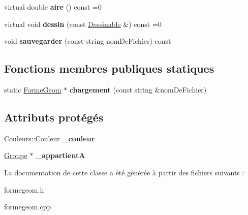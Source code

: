 \begin{DoxyCompactItemize}
\item 
\hypertarget{class_forme_geom_a1812fc8597994c1bc75a577785c356dd}{virtual double {\bfseries aire} () const =0}\label{class_forme_geom_a1812fc8597994c1bc75a577785c356dd}

\item 
\hypertarget{class_forme_geom_a80fabca42026f9a5d72fd12988da164e}{virtual void {\bfseries dessin} (const \hyperlink{class_dessinable}{Dessinable} \&) const =0}\label{class_forme_geom_a80fabca42026f9a5d72fd12988da164e}

\item 
\hypertarget{class_forme_geom_a25ff69dc148f04e4d9bc5e5305a08d10}{void {\bfseries sauvegarder} (const string nom\+De\+Fichier) const }\label{class_forme_geom_a25ff69dc148f04e4d9bc5e5305a08d10}

\end{DoxyCompactItemize}
\subsection*{Fonctions membres publiques statiques}
\begin{DoxyCompactItemize}
\item 
\hypertarget{class_forme_geom_a874df9fef2c3f6dd1b4eaf1496f6870b}{static \hyperlink{class_forme_geom}{Forme\+Geom} $\ast$ {\bfseries chargement} (const string \&nom\+De\+Fichier)}\label{class_forme_geom_a874df9fef2c3f6dd1b4eaf1496f6870b}

\end{DoxyCompactItemize}
\subsection*{Attributs protégés}
\begin{DoxyCompactItemize}
\item 
\hypertarget{class_forme_geom_a81f31ae59515184c36eee84bf2191472}{Couleurs\+::\+Couleur {\bfseries \+\_\+couleur}}\label{class_forme_geom_a81f31ae59515184c36eee84bf2191472}

\item 
\hypertarget{class_forme_geom_a4f7af3f9b22145883ea319eee243dfd4}{\hyperlink{class_groupe}{Groupe} $\ast$ {\bfseries \+\_\+appartient\+A}}\label{class_forme_geom_a4f7af3f9b22145883ea319eee243dfd4}

\end{DoxyCompactItemize}


La documentation de cette classe a été générée à partir des fichiers suivants \+:\begin{DoxyCompactItemize}
\item 
formegeom.\+h\item 
formegeom.\+cpp\end{DoxyCompactItemize}
